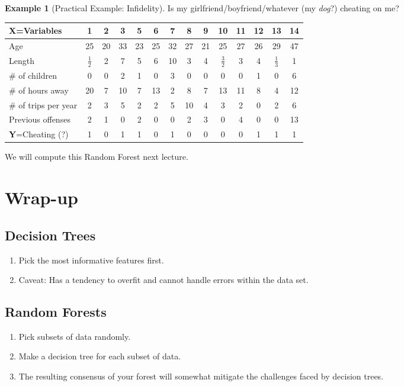\documentclass{article}
\theoremstyle{definition}
\newtheorem{myExample}{Example}
\begin{document}
\newpage
\begin{siderules}
\begin{myExample}[Practical Example: Infidelity]
Is my girlfriend/boyfriend/whatever (my \textit{dog}?) cheating on me?
\begin{center}
\begin{tabular}{| l || c | c | c | c | c | c | c | c | c | c | c | c | c |}
\hline
\textbf{X}=\textbf{Variables} & 1 & 2 & 3 & 5 & 6 & 7 & 8 & 9 & 10 & 11 & 12 & 13 & 14  \\ \hline \hline
Age & 25 & 20 & 33 & 23 & 25 & 32 & 27 & 21 & 25 & 27 & 26 & 29 & 47  \\ \hline
Length & $\frac{1}{2}$ & 2 & 7 & 5 & 6 & 10 & 3 & 4 & $\frac{3}{2}$ & 3 & 4 & $\frac{1}{3}$ & 1 \\ \hline
\# of children & 0 & 0 & 2 & 1 & 0 & 3 & 0 & 0 & 0 & 0 & 1 & 0 & 6 \\ \hline
\# of hours away & 20 & 7 & 10 & 7 & 13 & 2 & 8 & 7 & 13 & 11 & 8 & 4 & 12 \\ \hline
\# of trips per year & 2 & 3 & 5 & 2 & 2 & 5 & 10 & 4 & 3 & 2 & 0 & 2 & 6 \\ \hline
Previous offenses & 2 & 1 & 0 & 2 & 0 & 0 & 2 & 3 & 0 & 4 & 0 & 0 & 13 \\ \hline \hline 
\textbf{Y}=Cheating (?) & 1 & 0 & 1 & 1 & 0 & 1 & 0 & 0 & 0 & 0 & 1 & 1 & 1\\ \hline 
\end{tabular}
\end{center}
We will compute this Random Forest next lecture.
\end{myExample}
\end{siderules}
\section{Wrap-up}
\subsection*{Decision Trees}
\begin{enumerate}[-]

\item
Pick the most informative features first.\newline
\item
Caveat: Has a tendency to overfit and cannot handle errors within the data set.
\end{enumerate}

\subsection*{Random Forests}
\begin{enumerate}[-]
\item
Pick subsets of data randomly.\newline
\item
Make a decision tree for each subset of data.\newline
\item
The resulting consensus of your forest will somewhat mitigate the challenges faced by decision trees.
\end{enumerate}
\end{document}

